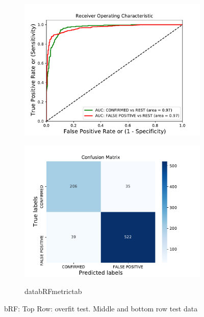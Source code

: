 \begin{figure}[H]
\begin{subfigure}{.49\textwidth}
                \includegraphics[width = 1\textwidth]{data/bRF_roc.pdf}
                \end{subfigure}
                \begin{subfigure}{.49\textwidth}
                \includegraphics[width = 1\textwidth]{data/bRF_cm.pdf}
                \end{subfigure}
                \begin{subfigure}{1\textwidth}
                \csname databRFmetrictab\endcsname
                \end{subfigure}
                \caption{bRF: Top Row: overfit test. Middle and bottom row test data}
                \label{fig:data/bRF_roc}
                \end{figure}